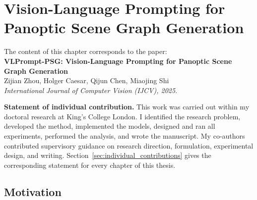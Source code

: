 \chapter{Vision-Language Prompting for Panoptic Scene Graph Generation}

\begin{tcolorbox}[
    breakable,
    colback=gray!5,
    colframe=black,
]
The content of this chapter corresponds to the paper: \\
\noindent \textbf{VLPrompt-PSG: Vision-Language Prompting for Panoptic Scene Graph Generation} \\
\noindent Zijian Zhou, Holger Caesar, Qijun Chen, Miaojing Shi \\
\noindent \textit{International Journal of Computer Vision (IJCV), 2025}.

\vspace{0.6em}
\noindent \textbf{Statement of individual contribution.}
This work was carried out within my doctoral research at King's College London. I identified the research problem, developed the method, implemented the models, designed and ran all experiments, performed the analysis, and wrote the manuscript. My co-authors contributed supervisory guidance on research direction, formulation, experimental design, and writing. Section~\ref{sec:individual_contributions} gives the corresponding statement for every chapter of this thesis.
\end{tcolorbox}

\section{Motivation}






